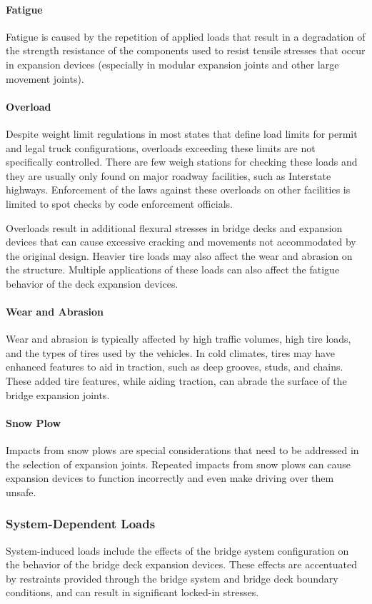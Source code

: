 \paragraph{Fatigue}
Fatigue is caused by the repetition of applied loads that result in a degradation of the strength resistance of the
components used to resist tensile stresses that occur in expansion devices (especially in modular expansion joints and
other large movement joints).

\paragraph{Overload}
Despite weight limit regulations in most states that define load limits for permit and legal truck configurations,
overloads exceeding these limits are not specifically controlled. There are few weigh stations for checking these
loads and they are usually only found on major roadway facilities, such as Interstate highways. Enforcement of the
laws against these overloads on other facilities is limited to spot checks by code enforcement officials.

Overloads result in additional flexural stresses in bridge decks and expansion devices that can cause excessive
cracking and movements not accommodated by the original design. Heavier tire loads may also affect the wear and abrasion on the structure. Multiple applications of these loads can also affect the fatigue behavior of the deck
expansion devices.

\paragraph{Wear and Abrasion}
Wear and abrasion is typically affected by high traffic volumes, high tire loads, and the types of tires used by the
vehicles. In cold climates, tires may have enhanced features to aid in traction, such as deep grooves, studs, and
chains. These added tire features, while aiding traction, can abrade the surface of the bridge expansion joints.

\paragraph{Snow Plow}
Impacts from snow plows are special considerations that need to be addressed in the selection of expansion joints. Repeated impacts from snow plows can cause expansion devices to function incorrectly and even make driving over them unsafe.

\subsubsection{System-Dependent Loads}
System-induced loads include the effects of the bridge system configuration on the behavior of the bridge deck
expansion devices. These effects are accentuated by restraints provided through the bridge system and bridge deck
boundary conditions, and can result in significant locked-in stresses.

